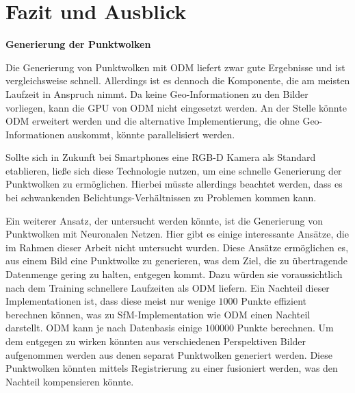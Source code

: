 \documentclass[12pt,titlepage, twoside]{article}
\begin{document}
\newpage
\section{Fazit und Ausblick}
\label{sec:fazit}
%

\textbf{Generierung der Punktwolken}

Die Generierung von Punktwolken mit ODM liefert zwar gute Ergebnisse und ist vergleichsweise schnell. Allerdings ist es dennoch die Komponente, die am meisten Laufzeit in Anspruch nimmt.
Da keine Geo-Informationen zu den Bilder vorliegen, kann die GPU von ODM nicht eingesetzt werden. 
An der Stelle könnte ODM erweitert werden und die alternative Implementierung, die ohne Geo-Informationen auskommt, könnte parallelisiert werden.

Sollte sich in Zukunft bei Smartphones eine RGB-D Kamera als Standard etablieren, ließe sich diese Technologie nutzen, um eine schnelle Generierung der Punktwolken zu ermöglichen.
Hierbei müsste allerdings beachtet werden, dass es bei schwankenden Belichtungs-Verhältnissen zu Problemen kommen kann. 

Ein weiterer Ansatz, der untersucht werden könnte, ist die Generierung von Punktwolken mit Neuronalen Netzen. Hier gibt es einige interessante Ansätze, die im Rahmen dieser Arbeit nicht untersucht wurden. 
Diese Ansätze ermöglichen es, aus einem Bild eine Punktwolke zu generieren, was dem Ziel, die zu übertragende Datenmenge gering zu halten, entgegen kommt. 
Dazu würden sie voraussichtlich nach dem Training schnellere Laufzeiten als ODM liefern.
Ein Nachteil dieser Implementationen ist, dass diese meist nur wenige $1000$ Punkte effizient berechnen können, was zu SfM-Implementation wie ODM einen Nachteil darstellt. 
ODM kann je nach Datenbasis einige $100000$ Punkte berechnen. 
Um dem entgegen zu wirken könnten aus verschiedenen Perspektiven Bilder aufgenommen werden aus denen separat Punktwolken generiert werden. Diese Punktwolken könnten mittels Registrierung zu einer fusioniert werden, was den Nachteil kompensieren könnte.
\end{document}
